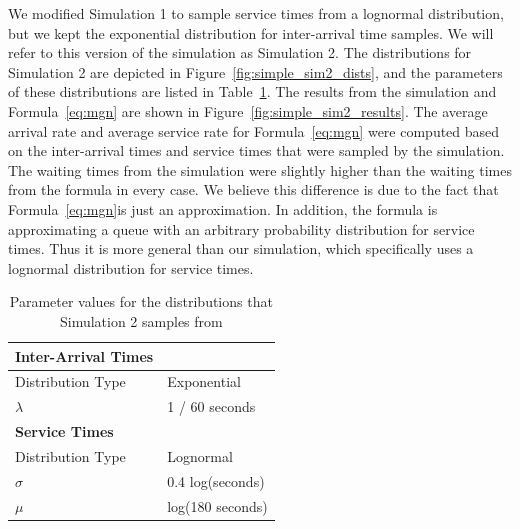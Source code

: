 We modified Simulation 1 to sample service times from a lognormal
distribution, but we kept the exponential distribution for inter-arrival time
samples.
We will refer to this version of the simulation as Simulation 2.
The distributions for Simulation 2 are depicted in
Figure~\ref{fig:simple_sim2_dists}, and the parameters of these distributions
are listed in Table~\ref{tab:sim2_params}.
The results from the simulation and Formula~\ref{eq:mgn} are shown in
Figure~\ref{fig:simple_sim2_results}.
The average arrival rate and average service rate for Formula~\ref{eq:mgn} were
computed based on the inter-arrival times and service times that were sampled by
the simulation.
The waiting times from the simulation were slightly higher than the waiting
times from the formula in every case.
We believe this difference is due to the fact that Formula~\ref{eq:mgn}is just
an approximation.
In addition, the formula is approximating a queue with an arbitrary probability
distribution for service times.
Thus it is more general than our simulation, which specifically uses a lognormal
distribution for service times.

\begin{table}
  \begin{tabular}{|l|l|}
    \hline
    \textbf{Inter-Arrival Times} & \\
    \hline
    Distribution Type & Exponential\\
    \hline
    $\lambda$ & 1 / 60 seconds\\
    \hline
    \hline
    \textbf{Service Times} & \\
    \hline
    Distribution Type & Lognormal\\
    \hline
    $\sigma$ & 0.4 log(seconds)\\
    \hline
    $\mu$ & log(180 seconds)\\
    \hline
  \end{tabular}
  \caption{
    Parameter values for the distributions that Simulation 2 samples from
  }\label{tab:sim2_params}
\end{table}

